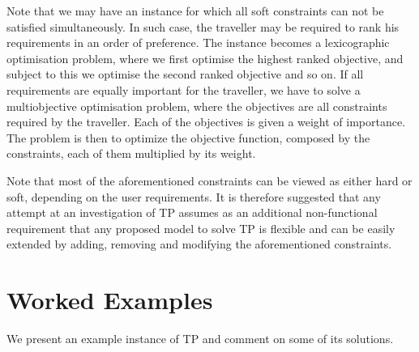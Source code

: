 \documentclass{mprop}
\theoremstyle{definition}
\begin{document}
Note that we may have an instance for which all soft constraints can not be satisfied simultaneously. In such case, the traveller may be required to rank his requirements in an order of preference. The instance becomes a lexicographic optimisation problem, where we first optimise the highest ranked objective, and subject to this we optimise the second ranked objective and so on.
If all requirements are equally important for the traveller, we have to solve a multiobjective optimisation problem, where the objectives are all constraints required by the traveller. Each of the objectives is given a weight of importance. The problem is then to optimize the objective function, composed by the constraints, each of them multiplied by its weight. %

Note that most of the aforementioned constraints can be viewed as either hard or soft, depending on the user requirements. It is therefore suggested that any attempt at an investigation of TP assumes as an additional non-functional requirement that any proposed model to solve TP is flexible and can be easily extended by adding, removing and modifying the aforementioned constraints.

\section{Worked Examples}
\label{sec:tpexample}
We present an example instance of TP and comment on some of its solutions.
\end{document}
